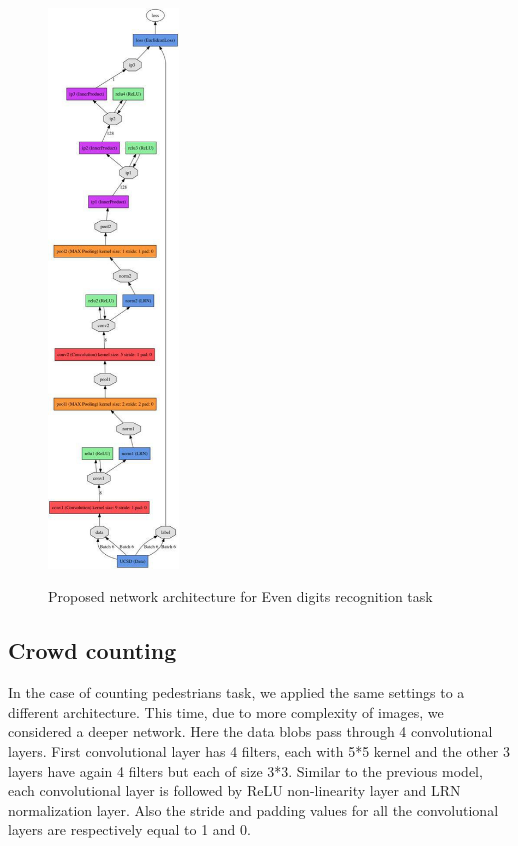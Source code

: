 \begin{figure}
  \centering
   {\includegraphics[width=0.31\textwidth]{images/model}}
	\caption{Proposed network architecture for Even digits recognition task}
	\label{fig:l2cNet}
\end{figure}
\subsection{Crowd counting}

In the case of counting pedestrians task, we applied the same settings to a different architecture. This time, due to more complexity of images, we considered a deeper network. Here the data blobs pass through 4 convolutional layers. First convolutional layer has 4 filters, each with 5*5 kernel and the other 3 layers have again 4 filters but each of size 3*3. Similar to the previous model, each convolutional layer is followed by ReLU non-linearity layer and LRN normalization layer. Also the stride and padding values for all the convolutional layers are respectively equal to 1 and 0. 

